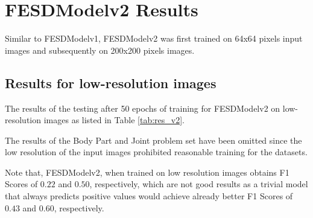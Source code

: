 \section{FESDModelv2 Results}

Similar to FESDModelv1, FESDModelv2 was first trained on 64x64 pixels input images and subsequently on 200x200 pixels images.

\subsection{Results for low-resolution images}

The results of the testing after 50 epochs of training for FESDModelv2 on low-resolution images as listed in Table \ref{tab:res_v2}.

The results of the Body Part and Joint problem set have been omitted since the low resolution of the input images prohibited reasonable training for the datasets.

\begin{center}    

\end{center}

Note that, FESDModelv2, when trained on low resolution images obtains F1 Scores of $0.22$ and $0.50$, respectively, which are not good results as a trivial model that always predicts positive values would achieve already better F1 Scores of $0.43$ and $0.60$, respectively.


